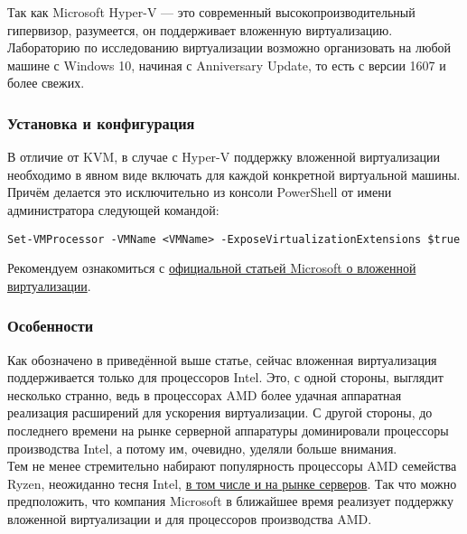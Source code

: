 \documentclass[14pt, a4paper]{article}
\begin{document}
Так как Microsoft Hyper-V — это современный высокопроизводительный гипервизор, разумеется, он
поддерживает вложенную виртуализацию. Лабораторию по исследованию виртуализации возможно
организовать на любой машине с Windows 10, начиная с Anniversary Update, то есть с версии 1607 и
более свежих.

\newpage

\subsubsection*{Установка и конфигурация}

В отличие от KVM, в случае с Hyper-V поддержку вложенной виртуализации необходимо в явном виде
включать для каждой конкретной виртуальной машины. Причём делается это исключительно из
консоли PowerShell от имени администратора следующей командой:

\begin{lstlisting}
Set-VMProcessor -VMName <VMName> -ExposeVirtualizationExtensions $true
\end{lstlisting}

Рекомендуем ознакомиться с \href{https://learn.microsoft.com/en-us/virtualization/hyper-v-on-windows/user-guide/nested-virtualization}{официальной статьей Microsoft о вложенной виртуализации}.

\subsubsection*{Особенности}

Как обозначено в приведённой выше статье, сейчас вложенная виртуализация поддерживается
только для процессоров Intel. Это, с одной стороны, выглядит несколько странно, ведь в процессорах
AMD более удачная аппаратная реализация расширений для ускорения виртуализации. С другой
стороны, до последнего времени на рынке серверной аппаратуры доминировали процессоры
производства Intel, а потому им, очевидно, уделяли больше внимания.\\

Тем не менее стремительно набирают популярность процессоры AMD семейства Ryzen, неожиданно
тесня Intel, \href{https://www.extremetech.com/computing/299191-amds-server-market-share-could-more-than-double-by-the-end-of-2020}{в том числе и на рынке серверов}. Так что можно предположить, что компания Microsoft в
ближайшее время реализует поддержку вложенной виртуализации и для процессоров производства
AMD.\\
\end{document}
